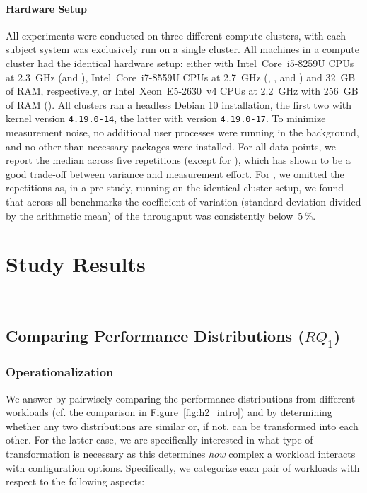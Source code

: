\paragraph{Hardware Setup}
All experiments were conducted on three different compute clusters, with each subject system was exclusively run on a single cluster. All machines in a compute cluster had the identical hardware setup: either with Intel~Core~i5-8259U CPUs at 2.3~GHz (\jumper and \kanzi),  Intel~Core~i7-8559U CPUs at 2.7~GHz (\dconvert, \batik, and \jadx) and 32~GB of RAM, respectively, or Intel~Xeon~E5-2630~v4 CPUs at 2.2~GHz with 256~GB of RAM (\htwo). All clusters ran a headless Debian 10 installation, the first two with kernel version \mbox{\texttt{4.19.0-14}}, the latter with version \mbox{\texttt{4.19.0-17}}. 
To minimize measurement noise, no additional user processes were running in the background, and no other than necessary packages were installed.	For all data points, we report the median across five repetitions (except for \htwo), which has shown to be a good trade-off between variance and measurement effort. For \htwo, we omitted the repetitions as, in a pre-study, running on the identical cluster setup, we found that across all benchmarks the coefficient of variation (standard deviation divided by the arithmetic mean) of the throughput was consistently below~5\,\%.

\section{Study Results}~\label{sec:results}
~
\subsection{Comparing Performance Distributions ($RQ_1$)}\label{sec:rq1}
\subsubsection{Operationalization}
We answer  by pairwisely comparing the performance distributions from different workloads (cf. the comparison in Figure~\ref{fig:h2_intro}) and by determining whether any two distributions are similar or, if not, can be transformed into each other. For the latter case, we are specifically interested in what type of transformation is necessary as this determines \textit{how} complex a workload interacts with configuration options. Specifically, we categorize each pair of workloads with respect to the following aspects: 

